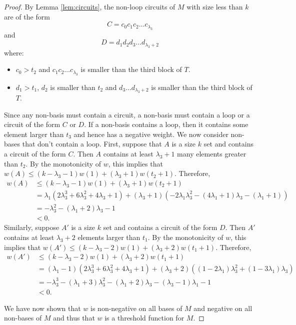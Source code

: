 \documentclass[10pt,a4paper]{amsart}
\theoremstyle{definition}
\theoremstyle{plain}
\begin{document}
\begin{proof}
\noindent By Lemma \ref{lem:circuits}, the non-loop circuits of $M$ with size less than $k$ are of the form 
\[C = c_0  c_{1}  c_{2} \ldots  c_{\lambda_3}\]
and 
\[D = d_1  d_{2}  d_{3} \ldots  d_{\lambda_3+2}\]
where: 
\begin{itemize}
\item $c_0>t_2$ and $c_{1} c_{2} \ldots c_{\lambda_3}$ is smaller than the third block of $T$.
\item $d_1>t_1$,  $d_{2}$ is smaller than $t_2$ and  $d_{3} \ldots d_{\lambda_3+2}$ is smaller than the third block of $T$.
\end{itemize}
Since any non-basis must contain a circuit, a non-basis must contain a loop or a circuit of the form $C$ or $D$. If a non-basis contains a loop, then it contains some element larger than $t_3$ and hence has a negative weight. We now consider non-bases that don't contain a loop. First, suppose that $A$ is a size $k$ set and contains a circuit of the form $C$. Then $A$ contains at least $\lambda_3+1$ many elements greater than $t_2$. By the monotonicity of $w$, this implies that $w(A) \leq (k-\lambda_3-1)w(1) + (\lambda_3+1)w(t_2+1)$. Therefore, 
\begin{align*}
w(A) &\leq (k-\lambda_3-1)w(1) + (\lambda_3+1)w(t_2+1)\\
     &= \lambda_1\left(2\lambda_3^3+6\lambda_3^2+4\lambda_3+1\right) + (\lambda_3+1)\left(-2\lambda_1\lambda_3^2-(4\lambda_1+1)\lambda_3-(\lambda_1+1)\right)\\
     &= -\lambda_3^2-(\lambda_1+2)\lambda_3-1\\
     &< 0.
\end{align*}
Similarly, suppose $A'$ is a size $k$ set and contains a circuit of the form $D$. Then $A'$ contains at least $\lambda_3+2$ elements larger than $t_1$. By the monotonicity of $w$, this implies that $w(A') \leq (k-\lambda_3-2)w(1) + (\lambda_3+2)w(t_1+1)$. Therefore, 
\begin{align*}
w(A') &\leq (k-\lambda_3-2)w(1) + (\lambda_3+2)w(t_1+1)\\
      &= (\lambda_1-1)\left(2\lambda_3^3+6\lambda_3^2+4\lambda_3+1\right) + (\lambda_3+2)\left((1-2\lambda_1)\lambda_3^2+(1-3\lambda_1)\lambda_3\right)\\
      &= -\lambda_3^3-(\lambda_1+3)\lambda_3^2-(\lambda_1+2)\lambda_3-(\lambda_3-1)\lambda_1-1\\
      &< 0.
\end{align*}

We have now shown that $w$ is non-negative on all bases of $M$ and negative on all non-bases of $M$ and thus that $w$ is a threshold function for $M$. 
\end{proof}
\end{document}
